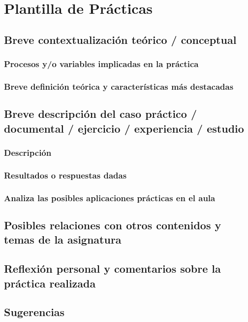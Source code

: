 \chapter{Plantilla de Prácticas}

\makeheader{\today}

\section{Breve contextualización teórico / conceptual}
\subsection{Procesos y/o variables implicadas en la práctica}

\subsection{Breve definición teórica y características más destacadas}


\section{Breve descripción del caso práctico / documental / ejercicio / experiencia / estudio}

\subsection{Descripción}
\subsection{Resultados o respuestas dadas}
\subsection{Analiza las posibles aplicaciones prácticas en el aula}

\section{Posibles relaciones con otros contenidos y temas de la asignatura}

\section{Reflexión personal y comentarios sobre la práctica realizada}

\section{Sugerencias}

